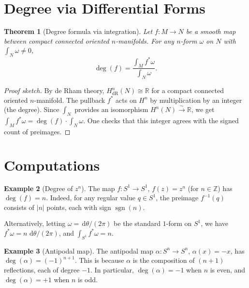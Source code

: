 \documentclass[12pt,a4paper,openany]{book}
\newtheorem{theorem}{Theorem}[section]
\theoremstyle{definition}
\newtheorem{example}[theorem]{Example}
\theoremstyle{remark}
\newcommand{\Z}{\mathbb{Z}}
\newcommand{\R}{\mathbb{R}}
\newcommand{\dd}{\,\mathrm{d}}
\newcommand{\abs}[1]{\left\lvert #1 \right\rvert}
\begin{document}
\section{Degree via Differential Forms}\label{sec:degree-forms}

\begin{theorem}[Degree formula via integration]\label{thm:degree-forms}
Let $f\colon M \to N$ be a smooth map between compact connected oriented
$n$-manifolds. For any $n$-form $\omega$ on $N$ with $\int_N \omega \neq 0$,
\[
  \deg(f) = \frac{\int_M f^*\omega}{\int_N \omega}.
\]
\end{theorem}

\begin{proof}[Proof sketch]
By de Rham theory, $H^n_{\mathrm{dR}}(N) \cong \R$ for a compact connected
oriented $n$-manifold. The pullback $f^*$ acts on $H^n$ by multiplication
by an integer (the degree). Since $\int_N$ provides an isomorphism
$H^n(N) \xrightarrow{\sim} \R$, we get
$\int_M f^*\omega = \deg(f)\cdot\int_N\omega$.
One checks that this integer agrees with the signed count of preimages.
\end{proof}

\section{Computations}\label{sec:degree-computations}

\begin{example}[Degree of $z^n$]\label{ex:degree-zn}
The map $f\colon S^1 \to S^1$, $f(z) = z^n$ (for $n \in \Z$) has
$\deg(f) = n$. Indeed, for any regular value $q \in S^1$, the preimage
$f^{-1}(q)$ consists of $\abs{n}$ points, each with sign
$\operatorname{sgn}(n)$.

Alternatively, letting $\omega = \dd\theta/(2\pi)$ be the standard
$1$-form on $S^1$, we have $f^*\omega = n\,\dd\theta/(2\pi)$,
and $\int_{S^1}f^*\omega = n$.
\end{example}

\begin{example}[Antipodal map]\label{ex:degree-antipodal}
The antipodal map $\alpha\colon S^n \to S^n$, $\alpha(x) = -x$,
has $\deg(\alpha) = (-1)^{n+1}$. This is because $\alpha$ is the
composition of $(n+1)$ reflections, each of degree $-1$.
In particular, $\deg(\alpha) = -1$ when $n$ is even, and
$\deg(\alpha) = +1$ when $n$ is odd.
\end{example}
\end{document}
